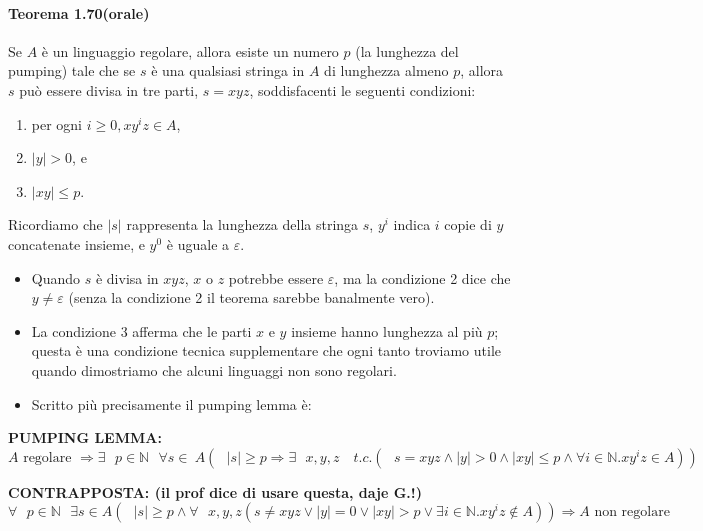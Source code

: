 \documentclass{article}
\begin{document}
\paragraph{Teorema 1.70(orale)}
\text{  }
\begin{tcolorbox}[colback=green!10!white, colframe=green!50!black, title=Teorema 1.70]
    Se $A$ è un linguaggio regolare, allora esiste un numero $p$ (la lunghezza del pumping) tale che se $s$ è una qualsiasi stringa in $A$ di lunghezza almeno $p$, allora $s$ può essere divisa in tre parti, $s = xyz$, soddisfacenti le seguenti condizioni:
    \begin{enumerate}
        \item per ogni $i \geq 0, xy^{i}z \in A$,
        \item $|y| > 0$, e
        \item $|xy| \leq p$.
    \end{enumerate}
\end{tcolorbox}

\begin{tcolorbox}[colback=red!10!white, colframe=red!50!black, title=IMPORTANTE!]
    Ricordiamo che $|s|$ rappresenta la lunghezza della stringa $s$, $y^{i}$ indica $i$ copie di $y$ concatenate insieme, e $y^{0}$ è uguale a $\varepsilon$.
\end{tcolorbox}

\begin{itemize}
    \item Quando $s$ è divisa in $xyz$, $x$ o $z$ potrebbe essere $\varepsilon$, ma la condizione 2 dice che $y \neq \varepsilon$ (senza la condizione 2 il teorema sarebbe banalmente vero).
    \item La condizione 3 afferma che le parti $x$ e $y$ insieme hanno lunghezza al più $p$; questa è una condizione tecnica supplementare che ogni tanto troviamo utile quando dimostriamo che alcuni linguaggi non sono regolari.
    \item Scritto più precisamente il pumping lemma è:
\end{itemize}
\vspace{1em}

\textbf{PUMPING LEMMA:}
$$
A \text{ regolare }\Rightarrow \exists\text{ }p \in \mathbb{N}\text{ }\forall s\in\ A(\text{ }|s| \geq p \Rightarrow \exists \text{ }x,y,z \quad t.c.(\text{ }s = xyz\wedge |y|>0 \wedge |xy|\leq p \wedge \forall i\in \mathbb{N}.xy^{i}z \in A))
$$
\vspace{1em}

\textbf{CONTRAPPOSTA: (il prof dice di usare questa, daje G.!)}
$$
\forall\text{ }p \in \mathbb{N}\text{ }\exists s\in A(\text{ }|s| \geq p \wedge \forall \text{ }x,y,z (s \neq xyz \vee |y| = 0 \vee |xy| > p \vee \exists i\in \mathbb{N}.xy^{i}z \notin A)) \Rightarrow A \text{ non regolare}
$$
\vspace{1em}
\end{document}

